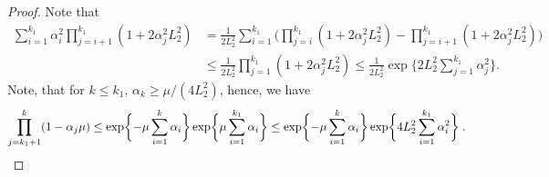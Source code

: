 \begin{proof}
Note that
\begin{align}
    \sum_{i=1}^{k_1}\alpha_i^2 \prod_{j=i+1}^{k_1}(1+2 \alpha_j^2L_2^2) 
    &=\frac{1}{ 2L_2^2}\sum_{i=1}^{k_1}\biggl(\prod_{j=i}^{k_1}(1+2 \alpha_j^2 L_2^2)-\prod_{j=i+1}^{k_1}(1+2 \alpha_j^2L_2^2)\biggr) \\
    &\leq \frac{1}{2L_2^2}\prod_{j=1}^{k_1}(1+2\alpha_j^2 L_2^2) \leq \frac{1}{2L_2^2}\exp\biggl\{2L_2^2\sum_{j=1}^{k_1}\alpha_j^2\biggr\}.
\end{align}
Note, that for $k\leq k_1$, $\alpha_k \geq \mu/(4L_2^2)$, hence, we have 
\begin{equation}
    \prod_{j=k_1+1}^k(1-\alpha_j\mu) \leq \exp\biggl\{-\mu\sum_{i=1}^k\alpha_i\biggr\}\exp\biggl\{\mu\sum_{i=1}^{k_1}\alpha_i\biggr\} \leq \exp\biggl\{-\mu\sum_{i=1}^k\alpha_i\biggr\}\exp\biggl\{4L_2^2 \sum_{i=1}^{k_1}\alpha_i^2\biggr\}\;.
\end{equation}


\end{proof}
